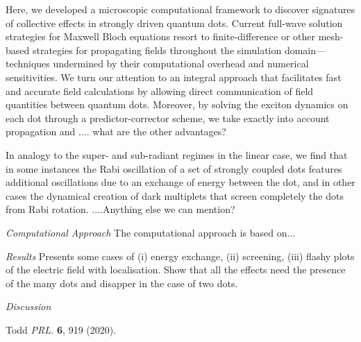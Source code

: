 \documentclass[twocolumn,aps,prl,showpacs]{revtex4-1}
\begin{document}
Here, we developed a microscopic computational framework to discover signatures of collective effects in strongly driven quantum dots. Current full-wave solution strategies for Maxwell Bloch equations resort to finite-difference or other mesh-based strategies\cite{Vanneste2001, Fratalocchi2008} for propagating fields throughout the simulation domain---techniques undermined by their computational overhead and numerical sensitivities\cite{Baczewski2013}.  We turn our attention to an integral approach that facilitates fast and accurate field calculations by allowing direct communication of field quantities between quantum dots.  Moreover, by solving the exciton dynamics on each dot through a predictor-corrector scheme, we take exactly into account propagation and .... what are the other advantages? 

In analogy to the super- and sub-radiant regimes in the linear case, we find that in some instances the Rabi oscillation of a set of strongly coupled dots features additional oscillations due to an exchange of energy between the dot, and in other cases the dynamical creation of dark multiplets that screen completely the dots from Rabi rotation. ....Anything else we can mention?


{\it Computational Approach} The computational approach is based on...


{\it Results} Presents some cases of (i) energy exchange, (ii) screening, (iii) flashy plots of the electric field with localisation.  Show that all the effects need the presence of the many dots and disapper in the case of two dots.


{\it Discussion}

\begin{thebibliography}{99} 
 Todd
{\it PRL.} {\bf 6}, 919 (2020).
\end{thebibliography} 
\end{document}
